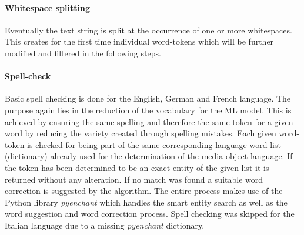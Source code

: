 \paragraph*{Whitespace splitting} \label{whitespace_splitting}
Eventually the text string is split at the occurrence of one or more whitespaces. This creates for the first time individual word-tokens which will be further modified and filtered in the following steps.

\paragraph*{Spell-check} \label{spell_check}
Basic spell checking is done for the English, German and French language. The purpose again lies in the reduction of the vocabulary for the ML model. This is achieved by ensuring the same spelling and therefore the same token for a given word by reducing the variety created through spelling mistakes. Each given word-token is checked for being part of the same corresponding language word list (dictionary) already used for the determination of the media object language. If the token has been determined to be an exact entity of the given list it is returned without any alteration. If no match was found a suitable word correction is suggested by the algorithm. The entire process makes use of the Python library \textit{pyenchant} which handles the smart entity search as well as the word suggestion and word correction process. Spell checking was skipped for the Italian language due to a missing \textit{pyenchant} dictionary.

